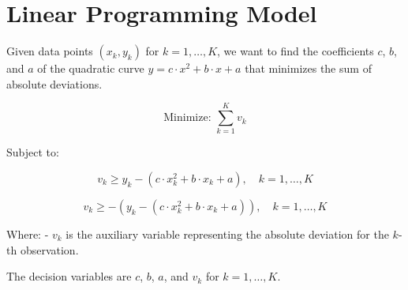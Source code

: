 \documentclass{article}
\begin{document}
\section*{Linear Programming Model}

Given data points \((x_k, y_k)\) for \(k = 1, \ldots, K\), we want to find the coefficients \(c\), \(b\), and \(a\) of the quadratic curve \(y = c \cdot x^2 + b \cdot x + a\) that minimizes the sum of absolute deviations.

\[
\text{Minimize: } \sum_{k=1}^K v_k
\]

Subject to:

\[
v_k \geq y_k - (c \cdot x_k^2 + b \cdot x_k + a), \quad k = 1, \ldots, K
\]

\[
v_k \geq - (y_k - (c \cdot x_k^2 + b \cdot x_k + a)), \quad k = 1, \ldots, K
\]

Where:
- \(v_k\) is the auxiliary variable representing the absolute deviation for the \(k\)-th observation.

The decision variables are \(c\), \(b\), \(a\), and \(v_k\) for \(k = 1, \ldots, K\).
\end{document}
